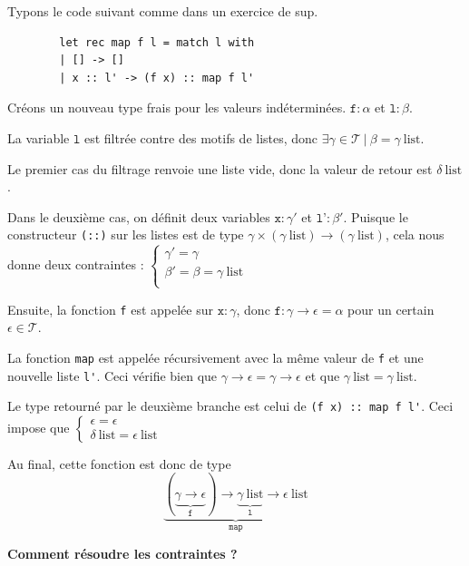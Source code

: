 \documentclass[11pt]{article}
\begin{document}
\begin{example}
    Typons le code suivant comme dans un exercice de sup.
    \begin{lstlisting}
        let rec map f l = match l with
        | [] -> []
        | x :: l' -> (f x) :: map f l'
    \end{lstlisting}

    Créons un nouveau type frais pour les valeurs indéterminées. $\texttt{f}:\alpha$ et $\texttt{l}:\beta$.

    La variable $\texttt{l}$ est filtrée contre des motifs de listes, donc $\exists \gamma\in\mathcal{T}~|~\beta=\gamma~\text{list}$.

    Le premier cas du filtrage renvoie une liste vide, donc la valeur de retour est $\delta~\text{list}$.

    Dans le deuxième cas, on définit deux variables $\texttt{x}:\gamma'$ et $\texttt{l'}:\beta'$. Puisque le constructeur \verb|(::)| sur les listes est de type $\gamma\times(\gamma~\text{list})\to(\gamma~\text{list})$, cela nous donne deux contraintes : $\begin{cases}
        \gamma'=\gamma\\
        \beta'=\beta=\gamma~\text{list}\\
    \end{cases}$

    Ensuite, la fonction \verb|f| est appelée sur $\texttt{x}:\gamma$, donc $\texttt{f}:\gamma\to\epsilon=\alpha$ pour un certain $\epsilon\in\mathcal{T}$.

    La fonction \verb|map| est appelée récursivement avec la même valeur de \verb|f| et une nouvelle liste \verb|l'|. Ceci vérifie bien que $\gamma\to\epsilon=\gamma\to\epsilon$ et que $\gamma~\text{list}=\gamma~\text{list}$.

    Le type retourné par le deuxième branche est celui de \verb|(f x) :: map f l'|. Ceci impose que $\begin{cases}
        \epsilon=\epsilon\\
        \delta~\text{list}=\epsilon~\text{list}
    \end{cases}$

    Au final, cette fonction est donc de type $$\underbrace{(\underbrace{\gamma\to\epsilon}_\texttt{f})\to\underbrace{\gamma~\text{list}}_\texttt{l}\to\epsilon~\text{list}}_\texttt{map}$$
\end{example}

\textbf{Comment résoudre les contraintes ?}
\end{document}
